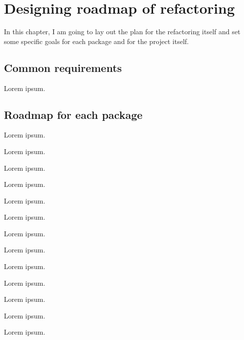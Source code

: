 \chapter{Designing roadmap of refactoring}

In this chapter, I am going to lay out the plan for the refactoring itself and set some specific goals for each package and for the project itself.

\section{Common requirements}

Lorem ipsum.

\section{Roadmap for each package}


Lorem ipsum.


Lorem ipsum.


Lorem ipsum.


Lorem ipsum.


Lorem ipsum.


Lorem ipsum.


Lorem ipsum.


Lorem ipsum.


Lorem ipsum.


Lorem ipsum.


Lorem ipsum.


Lorem ipsum.


Lorem ipsum.


